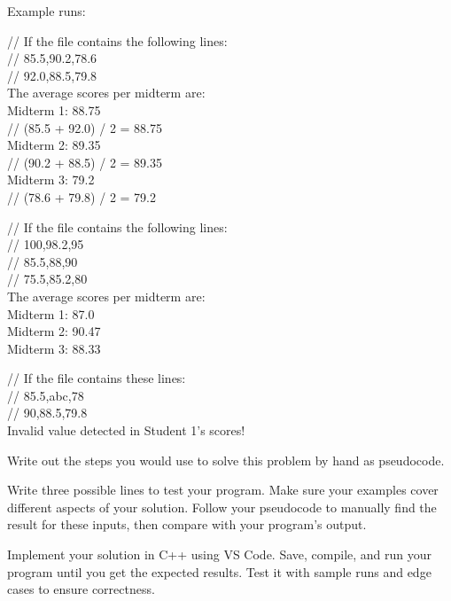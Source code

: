 Example runs:

\begin{sample}
// If the file contains the following lines: \\
// 85.5,90.2,78.6 \\
// 92.0,88.5,79.8 \\
The average scores per midterm are: \\
Midterm 1: 88.75 \\
// (85.5 + 92.0) / 2 = 88.75 \\
Midterm 2: 89.35 \\
// (90.2 + 88.5) / 2 = 89.35 \\
Midterm 3: 79.2 \\
// (78.6 + 79.8) / 2 = 79.2 \\
\end{sample}

\begin{sample}
// If the file contains the following lines: \\
// 100,98.2,95 \\
// 85.5,88,90 \\
// 75.5,85.2,80 \\
The average scores per midterm are: \\
Midterm 1: 87.0 \\
Midterm 2: 90.47 \\
Midterm 3: 88.33
\end{sample}

\begin{sample}
// If the file contains these lines: \\
// 85.5,abc,78 \\
// 90,88.5,79.8 \\
Invalid value detected in Student 1’s scores!
\end{sample}


\newpage

\begin{multipart}
Write out the steps you would use to solve this problem by hand as pseudocode. 
\end{multipart}

\vspace{10cm}

\begin{multipart}
Write three possible lines to test your program. Make sure your examples cover different aspects of your solution. Follow your pseudocode to manually find the result for these inputs, then compare with your program’s output.
\end{multipart}

\vspace{5cm}

\begin{multipart}
Implement your solution in C++ using VS Code. Save, compile, and run your program until you get the expected results. Test it with sample runs and edge cases to ensure correctness.
\end{multipart}